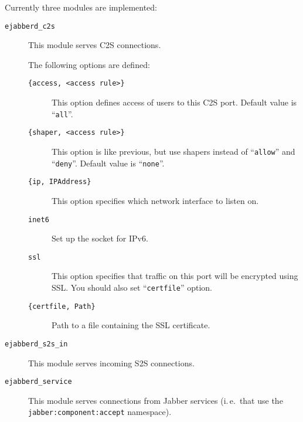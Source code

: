 \documentclass[10pt]{article}
\newcommand{\Jabber}{Jabber}
\begin{document}
Currently three modules are implemented:
\begin{description}
\item[\verb|ejabberd_c2s|] This module serves C2S connections.
  
  The following options are defined:
  \begin{description}
  \item[\verb|{access, <access rule>}|] This option defines access of users
    to this C2S port.  Default value is ``\texttt{all}''.
  \item[\verb|{shaper, <access rule>}|] This option is like previous, but
    use shapers instead of ``\texttt{allow}'' and ``\texttt{deny}''.  Default
    value is ``\texttt{none}''.
  \item[\verb|{ip, IPAddress}|] This option specifies which network interface to
    listen on.
  \item[\verb|inet6|] Set up the socket for IPv6.
  \item[\verb|ssl|] This option specifies that traffic on this port will be
    encrypted using SSL.  You should also set ``\verb|certfile|'' option.
  \item[\verb|{certfile, Path}|] Path to a file containing the SSL certificate.
  \end{description}
\item[\verb|ejabberd_s2s_in|] This module serves incoming S2S connections.
\item[\verb|ejabberd_service|] This module serves connections from \Jabber{}
  services (i.\,e.\ that use the \texttt{jabber:component:accept} namespace).
\end{description}
\end{document}
